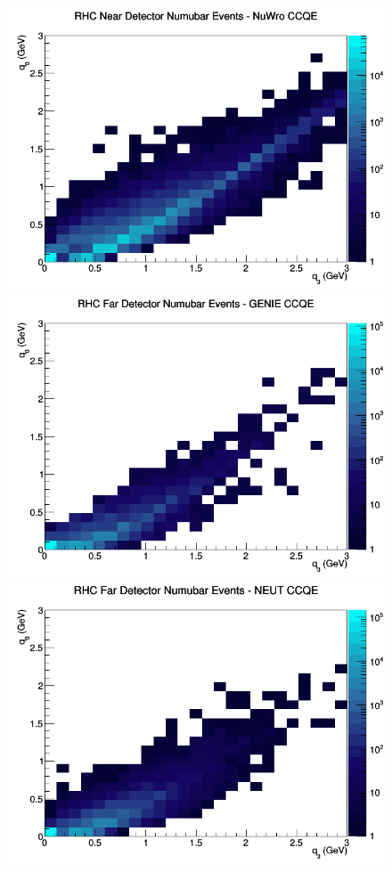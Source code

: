 \documentclass[12pt]{article}
\begin{document}
\begin{figure}[h]
\includegraphics[width=\linewidth]{eff_q0_q3/FGT/CCQE_RHC_ND_numubar_q3_q0_NuWro.png}
\endminipage
\newline
{}
\includegraphics[width=\linewidth]{eff_q0_q3/FGT/CCQE_RHC_FD_numubar_q3_q0_GENIE.png}
\endminipage
{}
\includegraphics[width=\linewidth]{eff_q0_q3/FGT/CCQE_RHC_FD_numubar_q3_q0_NEUT.png}

\end{figure}
\end{document}
